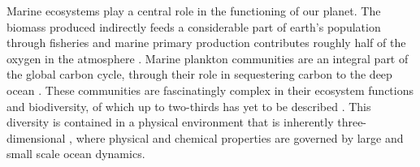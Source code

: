 \documentclass[journal abbreviation, manuscript]{copernicus}
\begin{document}
Marine ecosystems play a central role in the functioning of our planet. The biomass produced indirectly feeds a considerable part of earth’s population through fisheries \citep{Stock2017} and marine primary production contributes roughly half of the oxygen in the atmosphere \citep{Field1998PrimaryComponents}. Marine plankton communities are an integral part of the global carbon cycle, through their role in sequestering carbon to the deep ocean \citep{Falkowski1998BiogeochemicalProduction}. These communities are fascinatingly complex in their ecosystem functions and biodiversity, of which up to two-thirds has yet to be described \citep{Appeltans2012TheDiversity}. This diversity is contained in a physical environment that is inherently three-dimensional \citep{Levin2017AddingConservation}, where physical and chemical properties are governed by large and small scale ocean dynamics. 
\end{document}
